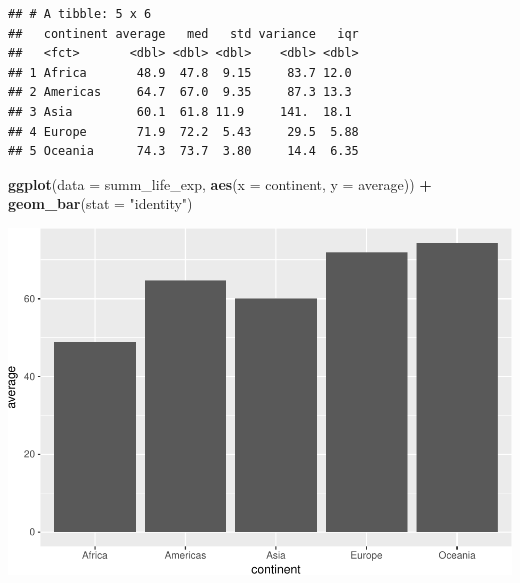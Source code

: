 \documentclass[]{article}
\newenvironment{Shaded}{\begin{snugshade}}{\end{snugshade}}
\newcommand{\KeywordTok}[1]{\textcolor[rgb]{0.13,0.29,0.53}{\textbf{#1}}}
\newcommand{\DataTypeTok}[1]{\textcolor[rgb]{0.13,0.29,0.53}{#1}}
\newcommand{\StringTok}[1]{\textcolor[rgb]{0.31,0.60,0.02}{#1}}
\newcommand{\OperatorTok}[1]{\textcolor[rgb]{0.81,0.36,0.00}{\textbf{#1}}}
\newcommand{\NormalTok}[1]{#1}
\begin{document}
\begin{verbatim}
## # A tibble: 5 x 6
##   continent average   med   std variance   iqr
##   <fct>       <dbl> <dbl> <dbl>    <dbl> <dbl>
## 1 Africa       48.9  47.8  9.15     83.7 12.0 
## 2 Americas     64.7  67.0  9.35     87.3 13.3 
## 3 Asia         60.1  61.8 11.9     141.  18.1 
## 4 Europe       71.9  72.2  5.43     29.5  5.88
## 5 Oceania      74.3  73.7  3.80     14.4  6.35
\end{verbatim}

\begin{Shaded}
\begin{Highlighting}[]
\KeywordTok{ggplot}\NormalTok{(}\DataTypeTok{data =}\NormalTok{ summ_life_exp, }
       \KeywordTok{aes}\NormalTok{(}\DataTypeTok{x =}\NormalTok{ continent, }\DataTypeTok{y =}\NormalTok{ average)) }\OperatorTok{+}
\StringTok{  }\KeywordTok{geom_bar}\NormalTok{(}\DataTypeTok{stat =} \StringTok{"identity"}\NormalTok{)}
\end{Highlighting}
\end{Shaded}

\includegraphics{Intro_data_wrangling_files/figure-latex/summ_cont-1.pdf}

\begin{Shaded}
\end{Shaded}
\end{document}
